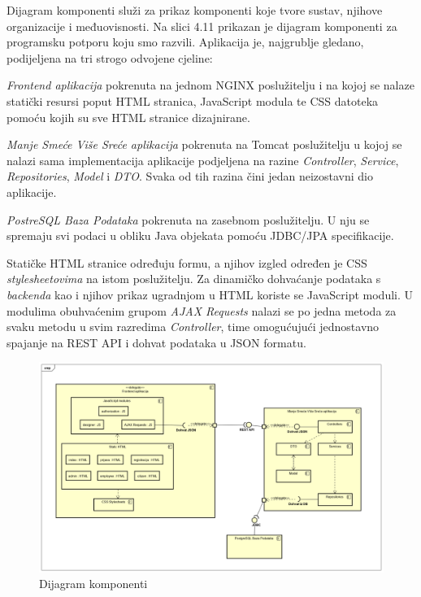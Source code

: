 			Dijagram komponenti služi za prikaz komponenti koje tvore sustav, njihove organizacije i međuovisnosti. Na slici 4.11 prikazan je dijagram komponenti za programsku potporu koju smo razvili. Aplikacija je, najgrublje gledano, podijeljena na tri strogo odvojene cjeline: 
			\begin{packed_item}
				\item \textit{Frontend aplikacija} pokrenuta na jednom NGINX poslužitelju i na kojoj se nalaze statički resursi poput HTML stranica, JavaScript modula te CSS datoteka pomoću kojih su sve HTML stranice dizajnirane.
				\item \textit{Manje Smeće Više Sreće aplikacija} pokrenuta na Tomcat poslužitelju u kojoj se nalazi sama implementacija aplikacije podjeljena na razine \textit{Controller}, \textit{Service}, \textit{Repositories}, \textit{Model} i \textit{DTO}. Svaka od tih razina čini jedan neizostavni dio aplikacije.
				\item \textit{PostreSQL Baza Podataka} pokrenuta na zasebnom poslužitelju. U nju se spremaju svi podaci u obliku Java objekata pomoću JDBC/JPA specifikacije.
			\end{packed_item}
			
			Statičke HTML stranice određuju formu, a njihov izgled određen je CSS \textit{stylesheetovima} na istom poslužitelju. Za dinamičko dohvaćanje podataka s \textit{backenda} kao i njihov prikaz ugradnjom u HTML koriste se JavaScript moduli. U modulima obuhvaćenim grupom \textit{AJAX Requests} nalazi se po jedna metoda za svaku metodu u svim razredima \textit{Controller}, time omogućujući jednostavno spajanje na REST API i dohvat podataka u JSON formatu.
			
			\begin{figure}[H]
				\includegraphics[scale=0.35]{figures/MSVSComponentDiagram.PNG}
				\centering
				\caption{Dijagram komponenti}
				\label{fig:komp-dijag}
			\end{figure} 
		
